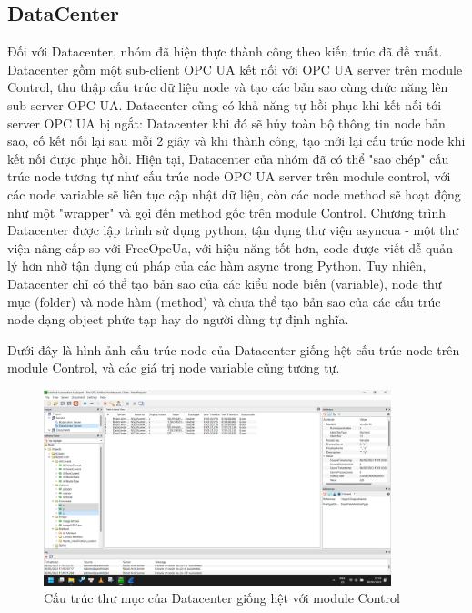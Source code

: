 \subsection{DataCenter}

Đối với Datacenter, nhóm đã hiện thực thành công theo kiến trúc đã đề xuất. Datacenter gồm một sub-client OPC UA kết nối với OPC UA server trên module Control, thu thập cấu trúc dữ liệu node và tạo các bản sao cùng chức năng lên sub-server OPC UA. Datacenter cũng có khả năng tự hồi phục khi kết nối tới server OPC UA bị ngắt: Datacenter khi đó sẽ hủy toàn bộ thông tin node bản sao, cố kết nối lại sau mỗi 2 giây và khi thành công, tạo mới lại cấu trúc node khi kết nối được phục hồi. Hiện tại, Datacenter của nhóm đã có thể "sao chép" cấu trúc node tương tự như cấu trúc node OPC UA server trên module control, với các node variable sẽ liên tục cập nhật dữ liệu, còn các node method sẽ hoạt động như một "wrapper" và gọi đến method gốc trên module Control. Chương trình Datacenter được lập trình sử dụng python, tận dụng thư viện asyncua - một thư viện nâng cấp so với FreeOpcUa, với hiệu năng tốt hơn, code được viết dễ quản lý hơn nhờ tận dụng cú pháp của các hàm async trong Python. Tuy nhiên, Datacenter chỉ có thể tạo bản sao của các kiểu node biến (variable), node thư mục (folder) và node hàm (method) và chưa thể tạo bản sao của các cấu trúc node dạng object phức tạp hay do người dùng tự định nghĩa.

Dưới đây là hình ảnh cấu trúc node của Datacenter giống hệt cấu trúc node trên module Control, và các giá trị node variable cũng tương tự.

    \begin{figure}[H]
    \centering
    \includegraphics[width=0.9\textwidth]{Images/Result/opc-structure_data.png}
    \caption{Cấu trúc thư mục của Datacenter giống hệt với module Control}
    \end{figure}


